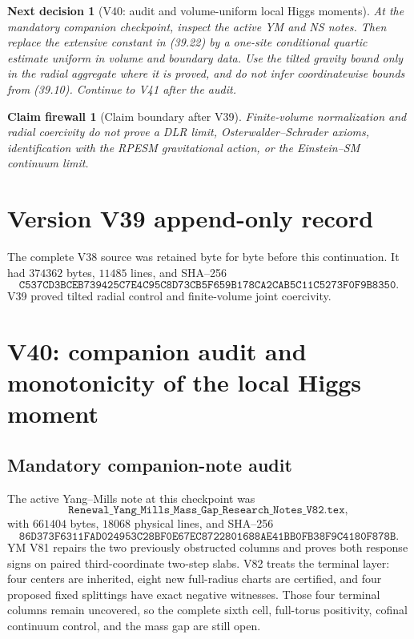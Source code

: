 \documentclass[11pt]{article}
\newtheorem{firewall}[theorem]{Claim firewall}
\newtheorem{decision}[theorem]{Next decision}
\theoremstyle{remark}
\begin{document}
\begin{decision}[V40: audit and volume-uniform local Higgs moments]
\label{dec:v17v39-next}
At the mandatory companion checkpoint, inspect the active YM and NS
notes.  Then replace the extensive constant in (39.22) by a one-site
conditional quartic estimate uniform in volume and boundary data.  Use
the tilted gravity bound only in the radial aggregate where it is
proved, and do not infer coordinatewise bounds from (39.10).  Continue
to V41 after the audit.
\end{decision}

\begin{firewall}[Claim boundary after V39]
\label{fire:v17v39}
Finite-volume normalization and radial coercivity do not prove a DLR
limit, Osterwalder--Schrader axioms, identification with the RPESM
gravitational action, or the Einstein--SM continuum limit.
\end{firewall}

\section*{Version V39 append-only record}
The complete V38 source was retained byte for byte before this
continuation.  It had \(374362\) bytes, \(11485\) lines, and SHA--256
\[
 \texttt{C537CD3BCEB739425C7E4C95C8D73CB5F659B178CA2CAB5C11C5273F0F9B8350}.
\]
V39 proved tilted radial control and finite-volume joint coercivity.


\section{V40: companion audit and monotonicity of the local Higgs moment}
\label{sec:v17v40}

\subsection{Mandatory companion-note audit}

The active Yang--Mills note at this checkpoint was
\[
 \texttt{Renewal\_Yang\_Mills\_Mass\_Gap\_Research\_Notes\_V82.tex},
                                                               \tag{40.1}
\]
with \(661404\) bytes, \(18068\) physical lines, and SHA--256
\[
 \texttt{86D373F6311FAD024953C28BF0E67EC8722801688AE41BB0FB38F9C4180F878B}.
                                                               \tag{40.2}
\]
YM V81 repairs the two previously obstructed columns and proves both
response signs on paired third-coordinate two-step slabs.  V82 treats
the terminal layer: four centers are inherited, eight new full-radius
charts are certified, and four proposed fixed splittings have exact
negative witnesses.  Those four terminal columns remain uncovered, so
the complete sixth cell, full-torus positivity, cofinal continuum
control, and the mass gap are still open.
\end{document}
